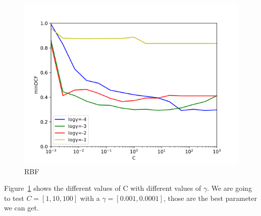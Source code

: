 \documentclass[english]{report}
\begin{document}
\begin{figure}[h!]
    \includegraphics[scale = 0.5]{../../images/validation/SVM_RBF_minDCF_comparison}
    \centering
    \caption{RBF}
    \label{fig:RBF_valid}
\end{figure}

Figure~\ref{fig:RBF_valid} shows the different values of C with different values of $\gamma$.
We are going to test \(C = [1, 10, 100]\) with a \(\gamma = [0.001, 0.0001]\), those are the best parameter we can get.
\end{document}
